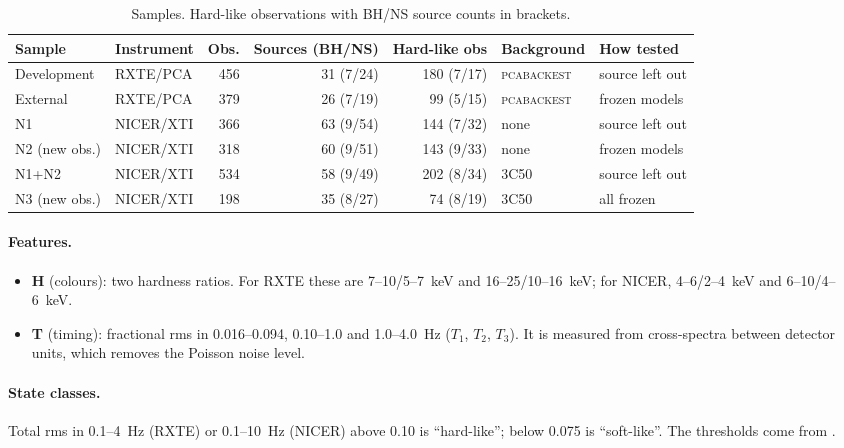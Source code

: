 \documentclass[11pt,a4paper]{article}
\begin{document}
\begin{table}[h]
\centering\small
\caption{Samples. Hard-like observations with BH/NS source counts in brackets.}\label{tab:samples}
\setlength{\tabcolsep}{4.5pt}
\begin{tabular}{@{}l l r r r l l@{}}
\toprule
Sample & Instrument & Obs. & Sources (BH/NS) & Hard-like obs & Background & How tested \\
\midrule
Development & RXTE/PCA & 456 & 31 (7/24) & 180 (7/17) & \textsc{pcabackest} & source left out \\
External & RXTE/PCA & 379 & 26 (7/19) & 99 (5/15) & \textsc{pcabackest} & frozen models \\
N1 & NICER/XTI & 366 & 63 (9/54) & 144 (7/32) & none & source left out \\
N2 (new obs.) & NICER/XTI & 318 & 60 (9/51) & 143 (9/33) & none & frozen models \\
N1+N2 & NICER/XTI & 534 & 58 (9/49) & 202 (8/34) & 3C50 & source left out \\
N3 (new obs.) & NICER/XTI & 198 & 35 (8/27) & 74 (8/19) & 3C50 & all frozen \\
\bottomrule
\end{tabular}
\end{table}

\paragraph{Features.}
\begin{itemize}[leftmargin=1.4em]
\item \textbf{H} (colours): two hardness ratios. For RXTE these are 7--10/5--7~keV and 16--25/10--16~keV; for NICER,
4--6/2--4~keV and 6--10/4--6~keV.
\item \textbf{T} (timing): fractional rms in 0.016--0.094, 0.10--1.0 and 1.0--4.0~Hz ($T_1$, $T_2$, $T_3$). It is
measured from cross-spectra between detector units, which removes the Poisson noise level.
\end{itemize}

\paragraph{State classes.}
Total rms in 0.1--4~Hz (RXTE) or 0.1--10~Hz (NICER) above 0.10 is ``hard-like''; below 0.075 is ``soft-like''. The
thresholds come from \citet{RemillardMcClintock2006}.
\end{document}
